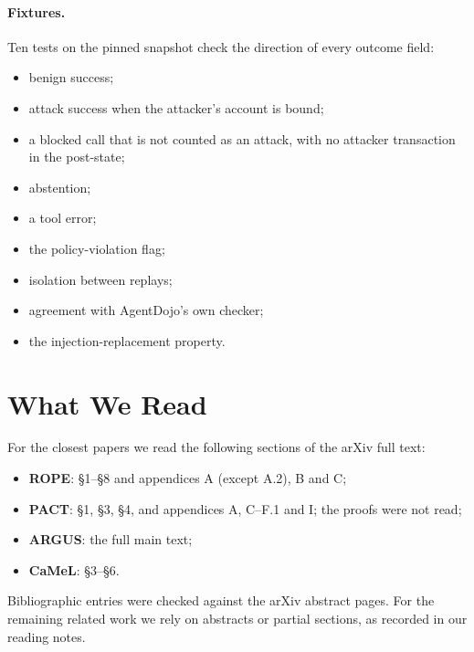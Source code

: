 \documentclass{article}
\begin{document}
\paragraph{Fixtures.}
Ten tests on the pinned snapshot check the direction of every outcome
field:
\begin{itemize}
\item benign success;
\item attack success when the attacker's account is bound;
\item a blocked call that is not counted as an attack, with no attacker
transaction in the post-state;
\item abstention;
\item a tool error;
\item the policy-violation flag;
\item isolation between replays;
\item agreement with AgentDojo's own checker;
\item the injection-replacement property.
\end{itemize}

\section{What We Read}
\label{app:reading}
For the closest papers we read the following sections of the arXiv full
text:
\begin{itemize}
\item \textbf{ROPE}: \S1--\S8 and appendices A (except A.2), B and C;
\item \textbf{PACT}: \S1, \S3, \S4, and appendices A, C--F.1 and I; the
proofs were not read;
\item \textbf{ARGUS}: the full main text;
\item \textbf{CaMeL}: \S3--\S6.
\end{itemize}
Bibliographic entries were checked against the arXiv abstract pages. For the
remaining related work we rely on abstracts or partial sections, as recorded
in our reading notes.
\end{document}
